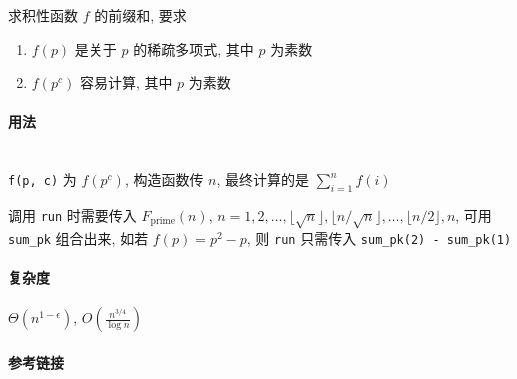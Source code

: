 求积性函数 \(f\) 的前缀和, 要求

\begin{enumerate}
    \item \(f(p)\) 是关于 \(p\) 的稀疏多项式, 其中 \(p\) 为素数
    \item \(f\left(p^c\right)\) 容易计算, 其中 \(p\) 为素数
\end{enumerate}

\paragraph{用法}~\\

\verb|f(p, c)| 为 \(f\left(p^c\right)\), 构造函数传 \(n\), 最终计算的是 \(\sum_{i=1}^n f(i)\)

调用 \verb|run| 时需要传入 \(F_{\text{prime}}(n)\), \(n=1,2,\dots,\lfloor\sqrt{n}\rfloor,\lfloor n/\sqrt{n}\rfloor,\dots,\lfloor n/2\rfloor,n\), 可用 \verb|sum_pk| 组合出来, 如若 \(f(p)=p^2-p\), 则 \verb|run| 只需传入 \verb|sum_pk(2) - sum_pk(1)|

\paragraph{复杂度}

\(\Theta\left(n^{1-\epsilon}\right)\), \(O\left(\frac{n^{3/4}}{\log n}\right)\)

\paragraph{参考链接}

